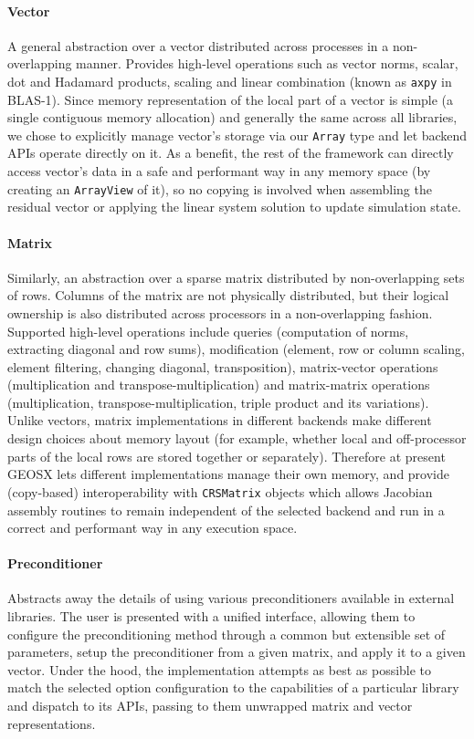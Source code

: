 \paragraph{Vector}
A general abstraction over a vector distributed across processes in a non-overlapping manner.   Provides high-level operations such as vector norms, scalar, dot and Hadamard products, scaling and linear combination (known as \texttt{axpy} in BLAS-1).   Since memory representation of the local part of a vector is simple (a single contiguous memory allocation) and generally the same across all libraries, we chose to explicitly manage vector's storage via our \texttt{Array} type and let backend APIs operate directly on it.   As a benefit, the rest of the framework can directly access vector's data in a safe and performant way in any memory space (by creating an \texttt{ArrayView} of it), so no copying is involved when assembling the residual vector or applying the linear system solution to update simulation state.

\paragraph{Matrix}
Similarly, an abstraction over a sparse matrix distributed by non-overlapping sets of rows.   Columns of the matrix are not physically distributed, but their logical ownership is also distributed across processors in a non-overlapping fashion.   Supported high-level operations include queries (computation of norms, extracting diagonal and row sums), modification (element, row or column scaling, element filtering, changing diagonal, transposition), matrix-vector operations (multiplication and transpose-multiplication) and matrix-matrix operations (multiplication, transpose-multiplication, triple product and its variations).   Unlike vectors, matrix implementations in different backends make different design choices about memory layout (for example, whether local and off-processor parts of the local rows are stored together or separately).   Therefore at present GEOSX lets different implementations manage their own memory, and provide (copy-based) interoperability with \texttt{CRSMatrix} objects which allows Jacobian assembly routines to remain independent of the selected backend and run in a correct and performant way in any execution space.
 
\paragraph{Preconditioner} 
Abstracts away the details of using various preconditioners available in external libraries.   The user is presented with a unified interface, allowing them to configure the preconditioning method through a common but extensible set of parameters, setup the preconditioner from a given matrix, and apply it to a given vector.   Under the hood, the implementation attempts as best as possible to match the selected option configuration to the capabilities of a particular library and dispatch to its APIs, passing to them unwrapped matrix and vector representations.

